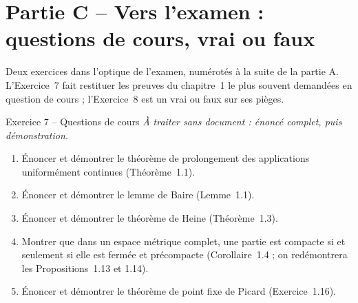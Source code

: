 \documentclass[11pt,a4paper]{article}
\theoremstyle{definition}
\begin{document}
\section*{Partie C -- Vers l'examen : questions de cours, vrai ou faux}

\begin{commentaire}
Deux exercices dans l'optique de l'examen, numérotés à la suite de la partie A. L'Exercice~7 fait restituer les preuves du chapitre~1 le plus souvent demandées en question de cours ; l'Exercice~8 est un vrai ou faux sur ses pièges.
\end{commentaire}

\begin{exo}{Exercice 7 -- Questions de cours}
\emph{À traiter sans document : énoncé complet, puis démonstration.}
\begin{enumerate}[label=(\alph*)]
  \item Énoncer et démontrer le théorème de prolongement des applications uniformément continues (Théorème~1.1).
  \item Énoncer et démontrer le lemme de Baire (Lemme~1.1).
  \item Énoncer et démontrer le théorème de Heine (Théorème~1.3).
  \item Montrer que dans un espace métrique complet, une partie est compacte si et seulement si elle est fermée et précompacte (Corollaire~1.4 ; on redémontrera les Propositions~1.13 et 1.14).
  \item Énoncer et démontrer le théorème de point fixe de Picard (Exercice~1.16).
\end{enumerate}
\end{exo}
\end{document}
